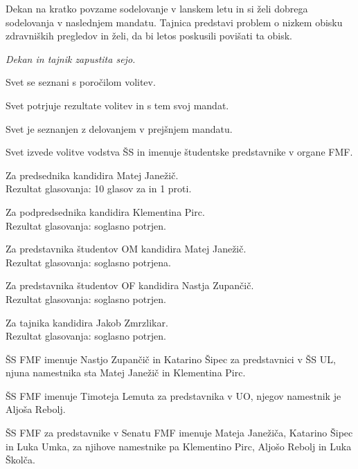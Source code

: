 \documentclass{seja}
\begin{document}
\begin{ad}
	\item
    Dekan na kratko povzame sodelovanje v lanskem letu in si želi dobrega sodelovanja v naslednjem mandatu. Tajnica predstavi problem o nizkem obisku zdravniških pregledov in želi, da bi letos poskusili povišati ta obisk.

	\textit{Dekan in tajnik zapustita sejo.}
	
	\item 
	Svet se seznani s poročilom volitev.
	\begin{sklep*}
	Svet potrjuje rezultate volitev in s tem svoj mandat.
	\end{sklep*}
	
	\item
	Svet je seznanjen z delovanjem v prejšnjem mandatu.

	\item
	Svet izvede volitve vodstva ŠS in imenuje študentske predstavnike v organe FMF.
	
	Za predsednika kandidira Matej Janežič.\\
	Rezultat glasovanja: 10 glasov za in 1 proti.
	
	Za podpredsednika kandidira Klementina Pirc.\\
	Rezultat glasovanja: soglasno potrjen.
	
	Za predstavnika študentov OM kandidira Matej Janežič.\\
	Rezultat glasovanja: soglasno potrjena.
	
	Za predstavnika študentov OF kandidira Nastja Zupančič.\\
	Rezultat glasovanja: soglasno potrjen.

	Za tajnika kandidira Jakob Zmrzlikar. \\
	Rezultat glasovanja: soglasno potrjen.
	
	\begin{sklep*}
	ŠS FMF imenuje Nastjo Zupančič in Katarino Šipec za predstavnici v ŠS UL, njuna namestnika sta Matej Janežič in Klementina Pirc.
	\end{sklep*}
	
	\begin{sklep*}
	ŠS FMF imenuje Timoteja Lemuta za predstavnika v UO, njegov namestnik je Aljoša Rebolj.
	\end{sklep*}
	
	\begin{sklep*}
	ŠS FMF za predstavnike v Senatu FMF imenuje Mateja Janežiča, Katarino Šipec in Luka Umka, za njihove namestnike pa Klementino Pirc, Aljošo Rebolj in Luka Školča.
	\end{sklep*}
	

\end{ad}
\end{document}

